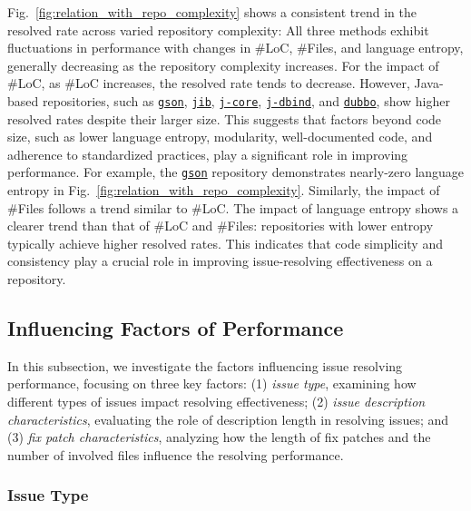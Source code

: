 \documentclass[11pt, a4paper, logo, copyright, nonumbering]{seed}
\newcommand{\mopenhands}{MopenHands\xspace}
\begin{document}
Fig.~\ref{fig:relation_with_repo_complexity} shows a consistent trend in the resolved rate across varied repository complexity: 
All three methods exhibit fluctuations in performance with changes in \#LoC, \#Files, and language entropy, generally decreasing as the repository complexity increases. 
For the impact of \#LoC, as \#LoC increases, the resolved rate tends to decrease. 
However, Java-based repositories, such as \href{https://github.com/google/gson}{\texttt{gson}}, \href{https://github.com/googlecontainertools/jib}{\texttt{jib}}, \href{https://github.com/fasterxml/jackson-core}{\texttt{j-core}}, \href{https://github.com/fasterxml/jackson-databind}{\texttt{j-dbind}}, and \href{https://github.com/apache/dubbo}{\texttt{dubbo}}, show higher resolved rates despite their larger size.
This suggests that factors beyond code size, such as lower language entropy, modularity, well-documented code, and adherence to standardized practices, play a significant role in improving performance.
For example, the \href{https://github.com/google/gson}{\texttt{gson}} repository demonstrates nearly-zero language entropy in Fig.~\ref{fig:relation_with_repo_complexity}.
Similarly, the impact of \#Files follows a trend similar to \#LoC. 
The impact of language entropy shows a clearer trend than that of \#LoC and \#Files: repositories with lower entropy typically achieve higher resolved rates. 
This indicates that code simplicity and consistency play a crucial role in improving issue-resolving effectiveness on a repository.


\subsection{Influencing Factors of Performance}
In this subsection, we investigate the factors influencing issue resolving performance, focusing on three key factors: 
(1) \emph{issue type}, examining how different types of issues impact resolving effectiveness;
(2) \emph{issue description characteristics}, evaluating the role of description length in resolving issues;
and (3) \emph{fix patch characteristics}, analyzing how the length of fix patches and the number of involved files influence the resolving performance.


\subsubsection{Issue Type}
\label{sec:issue_type}
\end{document}
